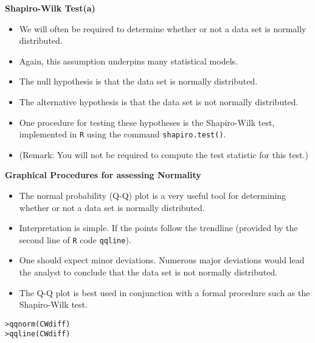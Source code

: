 \documentclass[]{report}
\begin{document}



\textbf{Shapiro-Wilk Test(a)}


\begin{itemize}
	\item We will often be required to determine whether or not a data set is normally distributed.
	\item Again, this assumption underpins many statistical models.
	\item The null hypothesis is that the data set is normally distributed.
	\item The alternative hypothesis is that the data set is not normally distributed.
	\item One procedure for testing these hypotheses is the Shapiro-Wilk test, implemented in \texttt{R} using the command \texttt{shapiro.test()}.
	\item (Remark: You will not be required to compute the test statistic for this test.)
\end{itemize}






\textbf{Graphical Procedures for assessing Normality}

\begin{itemize}
	\item The normal probability (Q-Q) plot is a very useful tool for determining whether or not a data set is normally distributed.
	\item Interpretation is simple. If the points follow the trendline (provided by the second line of \texttt{R} code \texttt{qqline}).
	\item One should expect minor deviations. Numerous major deviations would lead the analyst to conclude that the data set is not normally distributed.
	\item The Q-Q plot is best used in conjunction with a formal procedure such as the Shapiro-Wilk test.
\end{itemize}

\begin{verbatim}
>qqnorm(CWdiff)
>qqline(CWdiff)
\end{verbatim}
\end{document}
